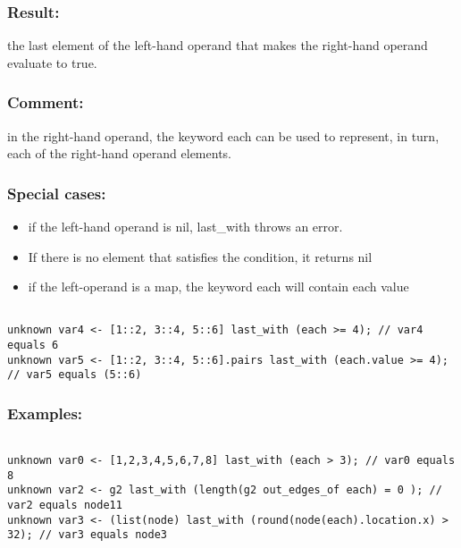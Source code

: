\documentclass[]{book}
\providecommand{\tightlist}{%
  \setlength{\itemsep}{0pt}\setlength{\parskip}{0pt}}
\theoremstyle{definition}
\theoremstyle{definition}
\theoremstyle{definition}
\theoremstyle{remark}
\begin{document}
\subsubsection{Result:}\label{result-308}

the last element of the left-hand operand that makes the right-hand
operand evaluate to true.

\subsubsection{Comment:}\label{comment-58}

in the right-hand operand, the keyword each can be used to represent, in
turn, each of the right-hand operand elements.

\subsubsection{Special cases:}\label{special-cases-86}

\begin{itemize}
\tightlist
\item
  if the left-hand operand is nil, last\_with throws an error.\\
\item
  If there is no element that satisfies the condition, it returns nil\\
\item
  if the left-operand is a map, the keyword each will contain each value
\end{itemize}

\begin{verbatim}
 
unknown var4 <- [1::2, 3::4, 5::6] last_with (each >= 4); // var4 equals 6 
unknown var5 <- [1::2, 3::4, 5::6].pairs last_with (each.value >= 4); // var5 equals (5::6)
\end{verbatim}

\subsubsection{Examples:}\label{examples-222}

\begin{verbatim}
 
unknown var0 <- [1,2,3,4,5,6,7,8] last_with (each > 3); // var0 equals 8 
unknown var2 <- g2 last_with (length(g2 out_edges_of each) = 0 ); // var2 equals node11 
unknown var3 <- (list(node) last_with (round(node(each).location.x) > 32); // var3 equals node3
\end{verbatim}
\end{document}

